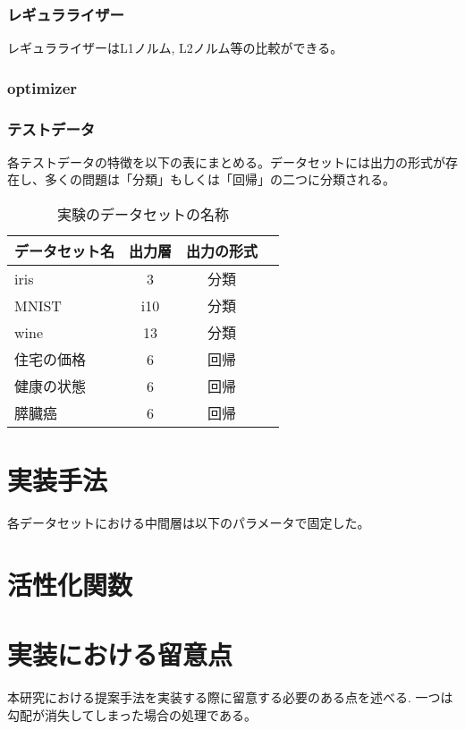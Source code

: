 \subsubsection{レギュラライザー}
レギュラライザーはL1ノルム, L2ノルム等の比較ができる。
\subsubsection{optimizer}
\subsubsection{テストデータ}
各テストデータの特徴を以下の表にまとめる。データセットには出力の形式が存在し、多くの問題は「分類」もしくは「回帰」の二つに分類される。


\begin{table}[htbp]
    \caption{実験のデータセットの名称}
    \begin{tabular}{l*{2}{c}r}
    データセット名      & 出力層 & 出力の形式 \\
    \hline
    iris            & 3  & 分類 \\
    MNIST               & i10 & 分類  \\
    wine        & 13 & 分類 \\
    住宅の価格           & 6 & 回帰 \\
    健康の状態           & 6 & 回帰 \\
    膵臓癌           & 6 & 回帰 \\
    \end{tabular}
\end{table}



\section{実装手法}

各データセットにおける中間層は以下のパラメータで固定した。


\section{活性化関数}



\section{実装における留意点}
本研究における提案手法を実装する際に留意する必要のある点を述べる.
一つは勾配が消失してしまった場合の処理である。

\section{}

